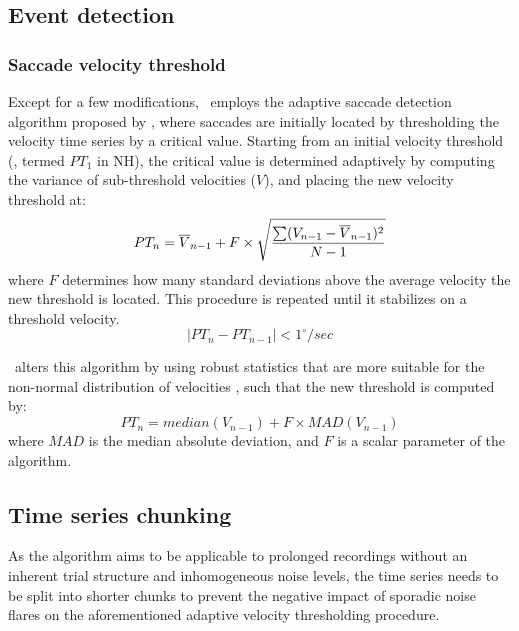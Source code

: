\subsection*{Event detection}

\subsubsection*{Saccade velocity threshold}

Except for a few modifications, \remodnav\ employs the adaptive saccade
detection algorithm proposed by \cite{Nystrom2010AnData}, where saccades are
initially located by thresholding the velocity time series by a critical value.
Starting from an initial velocity threshold (,
termed $PT_1$ in NH), the critical value is determined adaptively by computing
the variance of sub-threshold velocities ($V$), and placing the new velocity
threshold at:
%
\begin{equation} PT_n = \overline{V}_{n-1} + F \times \sqrt{{\sum(V_{n-1} -
  \overline{V}_{n-1})^2} \over {N-1}} \end{equation}
%
where $F$ determines how many standard deviations above the average velocity
the new threshold is located.  This procedure is repeated until it stabilizes
on a threshold velocity.
%
\begin{equation} |PT_n - PT_{n-1}| < 1^\circ/sec \end{equation}

\remodnav\ alters this algorithm by using robust statistics that are more
suitable for the non-normal distribution of velocities \citep{Friedman2018},
such that the new threshold is computed by:
%
\begin{equation}\label{eq:threshold}
PT_n = median({V}_{n-1}) + F \times MAD({V}_{n-1})
\end{equation}
%
where $MAD$ is the median absolute deviation, and $F$ is a
scalar parameter of the algorithm.

\subsection*{Time series chunking}

As the algorithm aims to be applicable to prolonged recordings without an
inherent trial structure and inhomogeneous noise levels, the time series needs
to be split into shorter chunks to prevent the negative impact of sporadic
noise flares on the aforementioned adaptive velocity thresholding procedure.

